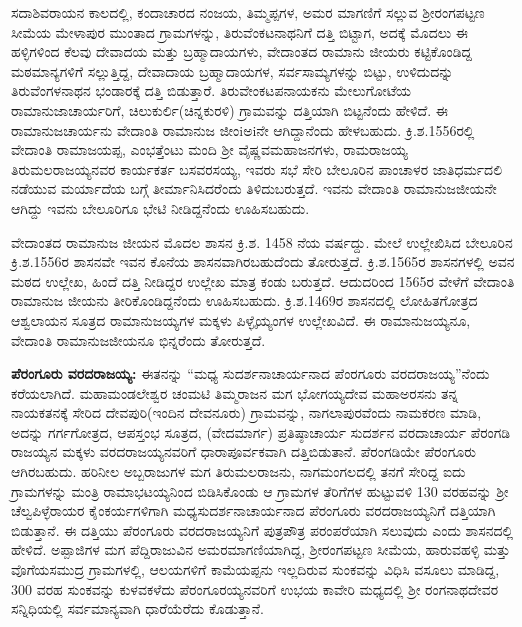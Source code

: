 ಸದಾಶಿವರಾಯನ ಕಾಲದಲ್ಲಿ, ಕಂದಾಚಾರದ ನಂಜಯ, ತಿಮ್ಮಪ್ಪಗಳ, ಅಮರ ಮಾಗಣಿಗೆ ಸಲ್ಲುವ ಶ‍್ರೀರಂಗಪಟ್ಟಣ ಸೀಮೆಯ ಮೇಳಾಪುರ ಮುಂತಾದ ಗ್ರಾಮಗಳನ್ನು, ತಿರುವೆಂಕಟನಾಥನಿಗೆ ದತ್ತಿ ಬಿಟ್ಟಾಗ, ಅದಕ್ಕೆ ಮೊದಲು ಈ ಹಳ್ಳಿಗಳಿಂದ ಕೆಲವು ದೇವಾದಯ ಮತ್ತು ಬ್ರಹ್ಮಾದಾಯಗಳು, ವೇದಾಂತದ ರಾಮಾನು ಜೀಯರು ಕಟ್ಟಿಕೊಂಡಿದ್ದ ಮಠಮಾನ್ಯಗಳಿಗೆ ಸಲ್ಲುತ್ತಿದ್ದ, ದೇವಾದಾಯ ಬ್ರಹ್ಮಾದಾಯಗಳ, ಸರ್ವಸಾಮ್ಯಗಳನ್ನು ಬಿಟ್ಟು, ಉಳಿದುದನ್ನು ತಿರುವೆಂಗಳನಾಥನ ಭಂಡಾರಕ್ಕೆ ದತ್ತಿ ಬಿಡುತ್ತಾರೆ. ತಿರುವೇಂಕಟಪನಾಯಕನು ಮೇಲುಗೋಟೆಯ ರಾಮಾನುಜಾಚಾರ್ಯರಿಗೆ, ಚಿಲುಕುರ್ಲಿ(ಚಿನ್ನಕುರಳಿ) ಗ್ರಾಮವನ್ನು ದತ್ತಿಯಾಗಿ ಬಿಟ್ಟನೆಂದು ಹೇಳಿದೆ. ಈ ರಾಮಾನುಜಚಾರ್ಯನು ವೇದಾಂತಿ ರಾಮಾನುಜ ಜೀಂiಅiನೇ ಆಗಿದ್ದಾನೆಂದು ಹೇಳಬಹುದು. ಕ್ರಿ.ಶ.1556ರಲ್ಲಿ ವೇದಾಂತಿ ರಾಮಾಜಯಪ್ಪ, ಎಂಭತ್ತೆಂಟು ಮಂದಿ ಶ‍್ರೀ ವೈಷ್ಣವಮಹಾಜನಗಳು, ರಾಮರಾಜಯ್ಯ ತಿರುಮಲರಾಜಯ್ಯನವರ ಕಾರ್ಯಕರ್ತ ಬಸವರಸಯ್ಯ, ಇವರು ಸಭೆ ಸೇರಿ ಬೇಲೂರಿನ ಪಾಂಚಾಳರ ಜಾತಿಧರ್ಮದಲಿ ನಡೆಯುವ ಮರ್ಯಾದೆಯ ಬಗ್ಗೆ ತೀರ್ಮಾನಿಸಿದರೆಂದು ತಿಳಿದುಬರುತ್ತದೆ. ಇವನು ವೇದಾಂತಿ ರಾಮಾನುಜಜೀಯನೇ ಆಗಿದ್ದು ಇವನು ಬೇಲೂರಿಗೂ ಭೇಟಿ ನೀಡಿದ್ದನೆಂದು ಊಹಿಸಬಹುದು.

ವೇದಾಂತದ ರಾಮಾನುಜ ಜೀಯನ ಮೊದಲ ಶಾಸನ ಕ್ರಿ.ಶ. 1458 ನೆಯ ವರ್ಷದ್ದು. ಮೇಲೆ ಉಲ್ಲೇಖಿಸಿದ ಬೇಲೂರಿನ ಕ್ರಿ.ಶ.1556ರ ಶಾಸನವೇ ಇವನ ಕೊನೆಯ ಶಾಸನವಾಗಿರಬಹುದೆಂದು ತೋರುತ್ತದೆ. ಕ್ರಿ.ಶ.1565ರ ಶಾಸನಗಳಲ್ಲಿ ಅವನ ಮಠದ ಉಲ್ಲೇಖ, ಹಿಂದೆ ದತ್ತಿ ನೀಡಿದ್ದರ ಉಲ್ಲೇಖ ಮಾತ್ರ ಕಂಡು ಬರುತ್ತದೆ. ಆದುದರಿಂದ 1565ರ ವೇಳೆಗೆ ವೇದಾಂತಿ ರಾಮಾನುಜ ಜೀಯನು ತೀರಿಕೊಂಡಿದ್ದನೆಂದು ಊಹಿಸಬಹುದು. ಕ್ರಿ.ಶ.1469ರ ಶಾಸನದಲ್ಲಿ ಲೋಹಿತಗೋತ್ರದ ಆಶ್ವಲಾಯನ ಸೂತ್ರದ ರಾಮಾನುಜಯ್ಯಗಳ ಮಕ್ಕಳು ಪಿಳ್ಳೈಯ್ಯಂಗಳ ಉಲ್ಲೇಖವಿದೆ. ಈ ರಾಮಾನುಜಯ್ಯನೂ, ವೇದಾಂತಿ ರಾಮಾನುಜಜೀಯನೂ ಭಿನ್ನರೆಂದು ತೋರುತ್ತದೆ.

\textbf{ಪೆರಂಗೂರು ವರದರಾಜಯ್ಯ:} ಈತನನ್ನು “ಮಧ್ಯ ಸುದರ್ಶನಾಚಾರ್ಯನಾದ ಪೆಂರಗೂರು ವರದರಾಜಯ್ಯ”ನೆಂದು ಕರೆಯಲಾಗಿದೆ. ಮಹಾಮಂಡಲೇಶ್ವರ ಚಂಮಟಿ ತಿಮ್ಮರಾಜನ ಮಗ ಭೋಗಯ್ಯದೇವ ಮಹಾಅರಸನು ತನ್ನ ನಾಯಕತನಕ್ಕೆ ಸೇರಿದ ದೇವಪುರಿ(ಇಂದಿನ ದೇವನೂರು) ಗ್ರಾಮವನ್ನು, ನಾಗಲಾಪುರವೆಂದು ನಾಮಕರಣ ಮಾಡಿ, ಅದನ್ನು ಗರ್ಗಗೋತ್ರದ, ಆಪಸ್ತಂಭ ಸೂತ್ರದ, (ವೇದಮಾರ್ಗ) ಪ್ರತಿಷ್ಠಾಚಾರ್ಯ ಸುದರ್ಶನ ವರದಾಚಾರ್ಯ ಪೆರಂಗಡಿ ರಾಜಯ್ಯನ ಮಕ್ಕಳು ವರದರಾಜಯ್ಯನವರಿಗೆ ಧಾರಾಪೂರ್ವಕವಾಗಿ ದತ್ತಿಬಿಡುತಾನೆ. ಪೆರಂಗಡಿಯೇ ಪೆರಂಗೂರು ಆಗಿರಬಹುದು. ಹರಿನೀಲ ಅಬ್ಬರಾಜುಗಳ ಮಗ ತಿರುಮಲರಾಜನು, ನಾಗಮಂಗಲದಲ್ಲಿ ತನಗೆ ಸೇರಿದ್ದ ಐದು ಗ್ರಾಮಗಳನ್ನು ಮಂತ್ರಿ ರಾಮಾಭಟಯ್ಯನಿಂದ ಬಿಡಿಸಿಕೊಂಡು ಆ ಗ್ರಾಮಗಳ ತೆರಿಗೆಗಳ ಹುಟ್ಟುವಳಿ 130 ವರಹವನ್ನು ಶ‍್ರೀ ಚೆಲ್ವಪಿಳ್ಳೆರಾಯರ ಕೈಂಕರ್ಯಗಳಿಗಾಗಿ ಮಧ್ಯಸುದರ್ಶನಾಚಾರ್ಯನಾದ ಪೆರಂಗೂರು ವರದರಾಜಯ್ಯನಿಗೆ ದತ್ತಿಯಾಗಿ ಬಿಡುತ್ತಾನೆ. ಈ ದತ್ತಿಯು ಪೆರಂಗೂರು ವರದರಾಜಯ್ಯನಿಗೆ ಪುತ್ರಪೌತ್ರ ಪರಂಪರೆಯಾಗಿ ಸಲುವುದು ಎಂದು ಶಾಸನದಲ್ಲಿ ಹೇಳಿದೆ. ಅಪ್ಪಾಜಿಗಳ ಮಗ ಪೆದ್ದಿರಾಜುವಿನ ಅಮರಮಾಗಣಿಯಾಗಿದ್ದ, ಶ‍್ರೀರಂಗಪಟ್ಟಣ ಸೀಮೆಯ, ಹಾರುವಹಳ್ಳಿ ಮತ್ತು ವೊಗೆಯಸಮುದ್ರ ಗ್ರಾಮಗಳಲ್ಲಿ, ಆಲಯಗಳಿಗೆ ಕಾಮೆಯಪ್ಪನು ಇಲ್ಲದಿರುವ ಸುಂಕವನ್ನು ವಿಧಿಸಿ ವಸೂಲು ಮಾಡಿದ್ದ, 300 ವರಹ ಸುಂಕವನ್ನು ಕುಳವಕಳೆದು ಪೆರಂಗೂರಯ್ಯನವರಿಗೆ ಉಭಯ ಕಾವೇರಿ ಮಧ್ಯದಲ್ಲಿ ಶ‍್ರೀ ರಂಗನಾಥದೇವರ ಸನ್ನಿಧಿಯಲ್ಲಿ ಸರ್ವಮಾನ್ಯವಾಗಿ ಧಾರೆಯೆರೆದು ಕೊಡುತ್ತಾನೆ.


